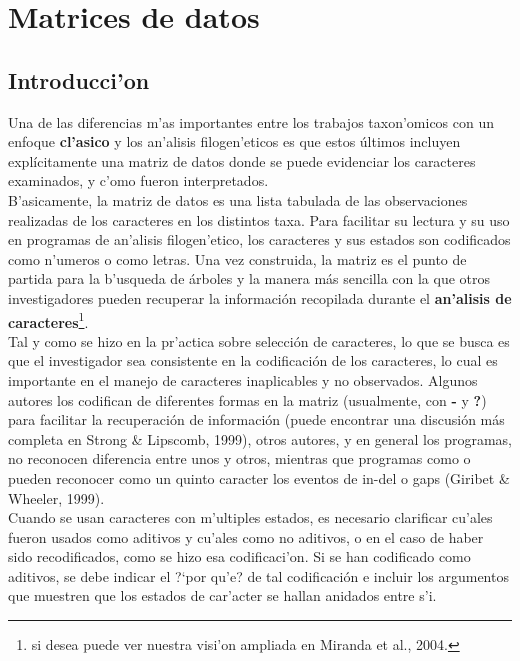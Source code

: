 \chapter{Matrices de datos}

\section*{Introducci'on} 

Una de las diferencias m'as importantes entre los trabajos taxon'omicos con un enfoque \textbf{cl'asico} y los an'alisis filogen'eticos es que estos \'ultimos incluyen expl\'icitamente una matriz de datos donde se puede evidenciar los caracteres examinados, y c'omo fueron interpretados.\\

B'asicamente, la matriz de datos es una lista tabulada de las observaciones realizadas de los caracteres en los distintos taxa. Para facilitar su lectura y su uso en programas de an'alisis filogen'etico, los caracteres y sus estados son codificados como n'umeros o como letras. Una vez construida, la matriz es el punto de partida para la b'usqueda de \'arboles y la manera m\'as sencilla con la que otros investigadores pueden recuperar la informaci\'on recopilada durante el \textbf{an'alisis de caracteres}\footnote{si desea puede ver nuestra visi'on ampliada en Miranda et al., 2004.}.\\

Tal y como se hizo en la pr'actica sobre selecci\'on de caracteres, lo que se busca es que el investigador sea consistente en la codificaci\'on de los caracteres, lo cual es importante en el manejo de caracteres inaplicables y no observados. Algunos autores los codifican de diferentes formas en la matriz (usualmente, con \textbf {-} y \textbf {?}) para facilitar la recuperaci\'on de informaci\'on (puede encontrar una discusi\'on m\'as completa en Strong \& Lipscomb, 1999),  otros autores, y en general los programas, no reconocen diferencia entre unos y otros, mientras que programas como  o  pueden reconocer como un quinto caracter los eventos de in-del o gaps (Giribet \& Wheeler, 1999).\\
%

Cuando se usan caracteres con m'ultiples estados, es necesario clarificar cu'ales fueron usados como aditivos y cu'ales como no aditivos, o en el caso de haber sido recodificados, como se hizo esa codificaci'on. Si se han codificado como aditivos, se debe indicar el ?`por qu'e? de tal codificaci\'on e incluir los argumentos que muestren que los estados de car'acter se hallan anidados entre s'i.\\



